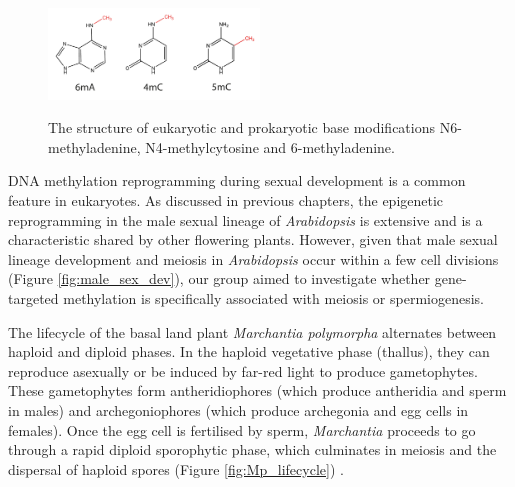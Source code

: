 \begin{figure}[htbp!] 
\centering    
    \includegraphics[width=0.5\textwidth]{Chapter3/Figs/Intro/base_mods.pdf}
\caption{The structure of eukaryotic and prokaryotic base modifications N6-methyladenine, N4-methylcytosine and 6-methyladenine.}
\label{fig:base_mods}
\captionsetup{font=small}
    \caption*{}
\end{figure}

DNA methylation reprogramming during sexual development is a common feature in eukaryotes. As discussed in previous chapters, the epigenetic reprogramming in the male sexual lineage of \textit{Arabidopsis} is extensive and is a characteristic shared by other flowering plants. However, given that male sexual lineage development and meiosis in \textit{Arabidopsis} occur within a few cell divisions (Figure \ref{fig:male_sex_dev}), our group aimed to investigate whether gene-targeted methylation is specifically associated with meiosis or spermiogenesis.

The lifecycle of the basal land plant \textit{Marchantia polymorpha} alternates between haploid and diploid phases. In the haploid vegetative phase (thallus), they can reproduce asexually or be induced by far-red light to produce gametophytes. These gametophytes form antheridiophores (which produce antheridia and sperm in males) and archegoniophores (which produce archegonia and egg cells in females). Once the egg cell is fertilised by sperm, \textit{Marchantia} proceeds to go through a rapid diploid sporophytic phase, which culminates in meiosis and the dispersal of haploid spores (Figure \ref{fig:Mp_lifecycle}) \cite{RN143}.

